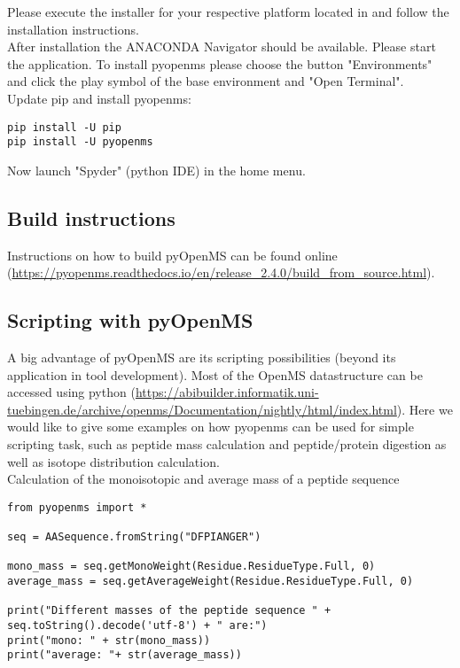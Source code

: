{\noindent Please execute the installer for your respective platform located in  and follow the installation instructions. \\

\noindent After installation the ANACONDA Navigator should be available. Please start the application. To install pyopenms please choose the button "Environments" and click the play symbol of the base environment and "Open Terminal". \\

\noindent  Update pip and install pyopenms:
\begin{lstlisting}
pip install -U pip
pip install -U pyopenms
\end{lstlisting}
    
\noindent  Now launch "Spyder" (python IDE) in the home menu.

\subsection{Build instructions}
Instructions on how to build pyOpenMS can be found online (\url{https://pyopenms.readthedocs.io/en/release_2.4.0/build_from_source.html}).

\subsection{Scripting with pyOpenMS}
A big advantage of pyOpenMS are its scripting possibilities (beyond its application in tool development). Most of the OpenMS datastructure can be accessed using python (\url{https://abibuilder.informatik.uni-tuebingen.de/archive/openms/Documentation/nightly/html/index.html}). Here we would like to give some examples on how pyopenms can be used for simple scripting task, such as peptide mass calculation and peptide/protein digestion as well as isotope distribution calculation. \\

\noindent Calculation of the monoisotopic and average mass of a peptide sequence 
\begin{lstlisting}
from pyopenms import *

seq = AASequence.fromString("DFPIANGER")

mono_mass = seq.getMonoWeight(Residue.ResidueType.Full, 0)
average_mass = seq.getAverageWeight(Residue.ResidueType.Full, 0)

print("Different masses of the peptide sequence " + seq.toString().decode('utf-8') + " are:")
print("mono: " + str(mono_mass))
print("average: "+ str(average_mass))
\end{lstlisting}

}
